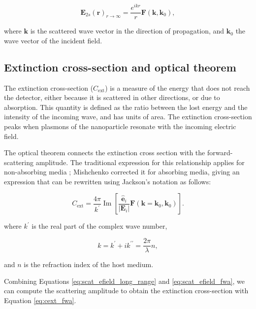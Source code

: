 \begin{equation} \label{eq:scat_efield_fwa}
    \mathbf{E}_{2s}(\mathbf{r})_{r\to\infty} = \frac{e^{ikr}}{r} \mathbf{F}(\mathbf{k},\mathbf{k}_0),
\end{equation}

where $\mathbf{k}$ is the scattered wave vector in the direction of propagation, and $\mathbf{k}_0$ the 
wave vector of the incident field. 

\subsection{Extinction cross-section and optical theorem} \label{sec:cext_ot}

The extinction cross-section ($C_\text{ext}$) is a measure of the energy that 
does not reach the detector, either because it is scattered in other directions,
or due to absorption. This quantity is defined as the ratio between the lost energy and 
the intensity of the incoming wave, and has units of area. The extinction cross-section peaks when
plasmons of the nanoparticle resonate with the incoming electric field.

The optical theorem connects the extinction cross section with the forward-scattering amplitude. The traditional 
expression for this relationship applies for non-absorbing media 
\cite{MayergoyzZhang2007, Jackson}; Mishchenko \cite{Mishchenko2007} corrected it for absorbing media, 
giving an expression that can be rewritten using Jackson's notation \cite{Jackson} as follows:

\begin{equation} \label{eq:cext_fwa}
    C_\text{ext} = \frac{4\pi}{k^\prime} \operatorname{Im} \left[ \frac{\mathbf{\hat{e}}_i}{|\mathbf{E}_i|}\mathbf{F}(\mathbf{k}=\mathbf{k}_0, \mathbf{k}_0) \right].
\end{equation}

where $k^\prime$ is the real part of the complex wave number, 

\begin{equation}
    k = k^\prime + ik^{\prime\prime} = \frac{2\pi}{\lambda} n,
\end{equation}

and $n$ is the refraction index of the host medium.

Combining Equations \eqref{eq:scat_efield_long_range} and \eqref{eq:scat_efield_fwa},
we can compute the scattering amplitude to  obtain the extinction cross-section 
with Equation \eqref{eq:cext_fwa}.

